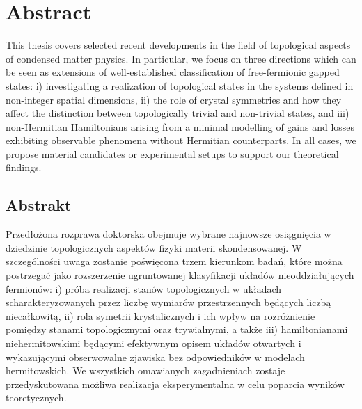 \begingroup
\let\clearpage\relax
\let\cleardoublepage\relax
\let\cleardoublepage\relax

\chapter*{Abstract}
This thesis covers selected recent developments in the field of topological aspects of condensed matter physics. In particular, we focus on three directions which can be seen as extensions of well-established classification of free-fermionic gapped states: i) investigating a realization of topological states in the systems defined in non-integer spatial dimensions, ii) the role of crystal symmetries and how they affect the distinction between topologically trivial and non-trivial states, and iii) non-Hermitian Hamiltonians arising from a minimal modelling of gains and losses exhibiting observable phenomena without Hermitian counterparts. In all cases, we propose material candidates or experimental setups to support our theoretical findings.
\endgroup

\cleardoublepage%

\begingroup
\let\clearpage\relax
\let\cleardoublepage\relax
\let\cleardoublepage\relax

\begin{otherlanguage}{polish}
\chapter*{Abstrakt}
Przedłożona rozprawa doktorska obejmuje wybrane najnowsze osiągnięcia w dziedzinie topologicznych aspektów fizyki materii skondensowanej. W szczególności uwaga zostanie poświęcona trzem kierunkom badań, które można postrzegać jako rozszerzenie ugruntowanej klasyfikacji układów nieoddziałujących fermionów: i) próba realizacji stanów topologicznych w układach scharakteryzowanych przez liczbę wymiarów przestrzennych będących liczbą niecałkowitą, ii) rola symetrii krystalicznych i ich wpływ na rozróżnienie pomiędzy stanami topologicznymi oraz trywialnymi, a także iii) hamiltonianami niehermitowskimi będącymi efektywnym opisem układów otwartych i wykazującymi obserwowalne zjawiska bez odpowiedników w modelach hermitowskich. We wszystkich omawianych zagadnieniach zostaje przedyskutowana możliwa realizacja eksperymentalna w celu poparcia wyników teoretycznych.
\end{otherlanguage}

\endgroup

\vfill